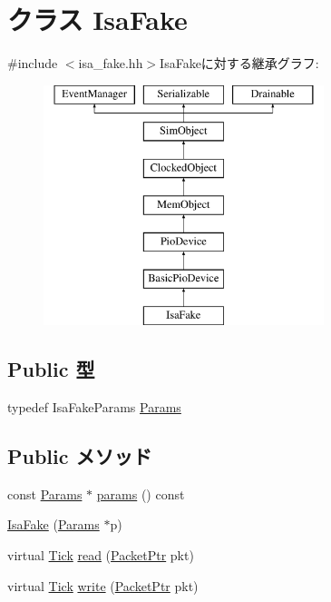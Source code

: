 \hypertarget{classIsaFake}{
\section{クラス IsaFake}
\label{classIsaFake}
}


{\ttfamily \#include $<$isa\_\-fake.hh$>$}IsaFakeに対する継承グラフ:\begin{figure}[H]
\begin{center}
\leavevmode
\includegraphics[height=7cm]{classIsaFake}
\end{center}
\end{figure}
\subsection*{Public 型}
\begin{DoxyCompactItemize}
\item 
typedef IsaFakeParams \hyperlink{classIsaFake_a9d89a786405f83fe384e7aadc17d5ce2}{Params}
\end{DoxyCompactItemize}
\subsection*{Public メソッド}
\begin{DoxyCompactItemize}
\item 
const \hyperlink{classIsaFake_a9d89a786405f83fe384e7aadc17d5ce2}{Params} $\ast$ \hyperlink{classIsaFake_acd3c3feb78ae7a8f88fe0f110a718dff}{params} () const 
\item 
\hyperlink{classIsaFake_a156ba05e64791b9db37902f932519e30}{IsaFake} (\hyperlink{classIsaFake_a9d89a786405f83fe384e7aadc17d5ce2}{Params} $\ast$p)
\item 
virtual \hyperlink{base_2types_8hh_a5c8ed81b7d238c9083e1037ba6d61643}{Tick} \hyperlink{classIsaFake_a613ec7d5e1ec64f8d21fec78ae8e568e}{read} (\hyperlink{classPacket}{PacketPtr} pkt)
\item 
virtual \hyperlink{base_2types_8hh_a5c8ed81b7d238c9083e1037ba6d61643}{Tick} \hyperlink{classIsaFake_a4cefab464e72b5dd42c003a0a4341802}{write} (\hyperlink{classPacket}{PacketPtr} pkt)
\end{DoxyCompactItemize}
